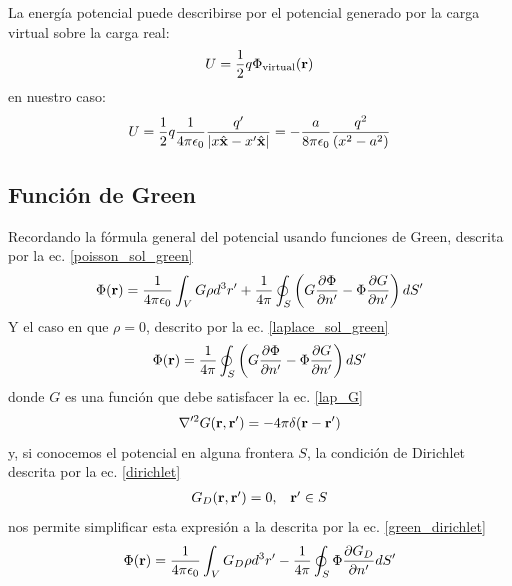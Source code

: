 \documentclass[]{article}
\numberwithin{equation}{section}
\begin{document}
La energía potencial puede describirse por el potencial generado por la carga virtual sobre la carga real:
\begin{equation}
	U = \frac{1}{2}q\Phi_\text{virtual}(\mathbf{r})
\end{equation}
en nuestro caso:
\begin{equation*}
	U = \frac{1}{2} q \ke \frac{q'}{|x\xhat - x'\xhat|} = -\frac{a}{8\pi\eo}\frac{q^2}{(x^2 - a^2)}
\end{equation*}

\subsection{Función de Green}
Recordando la fórmula general del potencial usando funciones de Green, descrita por la ec. \ref{poisson_sol_green}
\begin{equation*}
	\Phi(\mathbf{r}) = \frac{1}{4\pi\epsilon_{0}}\int_{V}G\rho d^3r' + \frac{1}{4\pi}\oint_{S}\left( G\frac{\partial\Phi}{\partial n'} - \Phi\frac{\partial G}{\partial n'} \right)dS'
\end{equation*}
Y el caso en que \(\rho = 0\), descrito por la ec. \ref{laplace_sol_green}
\begin{equation*}
	\Phi(\mathbf{r}) = \frac{1}{4\pi}\oint_{S}\left( G\frac{\partial\Phi}{\partial n'} - \Phi\frac{\partial G}{\partial n'} \right)dS'
\end{equation*}
donde \(G\) es una función que debe satisfacer la ec. \ref{lap_G}
\begin{equation*}
	\nabla'^2 G(\mathbf{r}, \mathbf{r}') = -4\pi\delta(\mathbf{r} - \mathbf{r}')
\end{equation*}
y, si conocemos el potencial en alguna frontera \(S\), la condición de Dirichlet descrita por la ec. \ref{dirichlet}
\begin{equation*}
	\begin{matrix}
		G_D(\mathbf{r},\mathbf{r}') = 0,& \mathbf{r}'\in S
	\end{matrix}
\end{equation*}
nos permite simplificar esta expresión a la descrita por la ec. \ref{green_dirichlet}
\begin{equation*}
	\Phi(\mathbf{r}) = \frac{1}{4\pi\epsilon_{0}}\int_{V}G_D\rho d^3r' - \frac{1}{4\pi}\oint_{S}\Phi\frac{\partial G_D}{\partial n'} dS'
\end{equation*}
\end{document}
